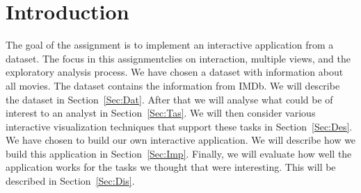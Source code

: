 \section{Introduction}
	The goal of the assignment is to implement an interactive application from a dataset. 
	The focus in this assignmentclies on interaction, multiple views, and the exploratory analysis process.
	We have chosen a dataset with information about all movies.
	The dataset contains the information from IMDb.
	We will describe the dataset in Section~\ref{Sec:Dat}.
	After that we will analyse what could be of interest to an analyst in Section~\ref{Sec:Tas}.
	We will then consider various interactive visualization techniques that support these tasks in Section~\ref{Sec:Des}.
	We have chosen to build our own interactive application.
	We will describe how we build this application in Section~\ref{Sec:Imp}.
	Finally, we will evaluate how well the application works for the tasks we thought that were interesting. 
	This will be described in Section~\ref{Sec:Dis}.
	

